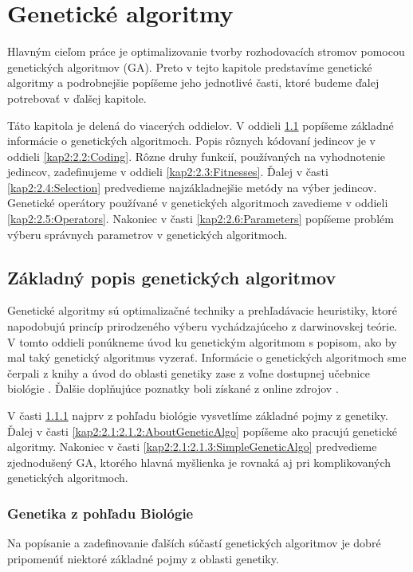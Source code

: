 \chapter{Genetické algoritmy}
Hlavným cieľom práce je optimalizovanie tvorby rozhodovacích stromov pomocou genetických algoritmov (GA). Preto 
v tejto kapitole predstavíme genetické algoritmy a podrobnejšie popíšeme jeho jednotlivé časti, ktoré budeme ďalej potrebovať v ďalšej kapitole.

Táto kapitola je delená do viacerých oddielov. V oddieli \ref{kap2:2.1:Info} popíšeme základné informácie o genetických algoritmoch. Popis rôznych kódovaní jedincov je v oddieli \ref{kap2:2.2:Coding}. Rôzne druhy funkcií, používaných na vyhodnotenie jedincov, zadefinujeme v oddieli \ref{kap2:2.3:Fitnesses}. Ďalej v časti \ref{kap2:2.4:Selection} predvedieme najzákladnejšie metódy na výber jedincov. Genetické operátory používané v genetických algoritmoch zavedieme v oddieli \ref{kap2:2.5:Operators}. Nakoniec v časti \ref{kap2:2.6:Parameters} popíšeme problém výberu správnych parametrov v genetických algoritmoch.

\section{Základný popis genetických algoritmov}\label{kap2:2.1:Info}
Genetické algoritmy sú optimalizačné techniky a prehľadávacie heuristiky, ktoré napodobujú princíp prirodzeného výberu vychádzajúceho z darwinovskej teórie. V tomto oddieli ponúkneme úvod ku genetickým algoritmom s popisom, ako by mal taký genetický algoritmus vyzerať. Informácie o genetických algoritmoch sme čerpali z knihy \cite{kap2-evolution} a úvod do oblasti genetiky zase z voľne dostupnej učebnice biológie \cite{online-biology}. Ďalšie doplňujúce poznatky boli získané z online zdrojov \cite{wiki-evolution,wiki-genetics}.

V časti \ref{kap2:2.1:2.1.1:Genetics} najprv z pohľadu biológie vysvetlíme základné pojmy z genetiky. Ďalej v časti \ref{kap2:2.1:2.1.2:AboutGeneticAlgo} popíšeme ako pracujú genetické algoritmy. Nakoniec v časti \ref{kap2:2.1:2.1.3:SimpleGeneticAlgo} predvedieme zjednodušený GA, ktorého hlavná myšlienka je rovnaká aj pri komplikovaných genetických algoritmoch.

\subsection{Genetika z pohľadu Biológie}\label{kap2:2.1:2.1.1:Genetics}
Na popísanie a zadefinovanie ďalších súčastí genetických algoritmov je dobré pripomenúť niektoré základné pojmy z oblasti genetiky. 

